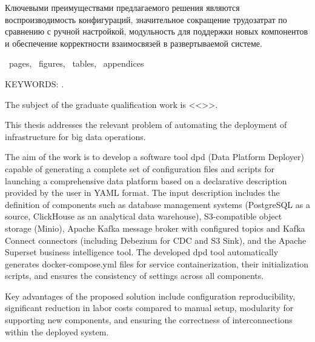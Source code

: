 Ключевыми преимуществами предлагаемого решения являются воспроизводимость конфигураций, значительное сокращение трудозатрат по сравнению с ручной настройкой, модульность для поддержки новых компонентов и обеспечение корректности взаимосвязей в развертываемой системе.




\newpage
\printTheAbstract %


~pages, 
~figures, 
~tables,
~appendices%

{\MakeUppercase{Keywords: \keywordsEn}.} %
	
The subject of the graduate qualification work is <<\thesisTitleEn>>.

This thesis addresses the relevant problem of automating the deployment of infrastructure for big data operations. 

The aim of the work is to develop a software tool dpd (Data Platform Deployer) capable of generating a complete set of configuration files and scripts for launching a comprehensive data platform based on a declarative description provided by the user in YAML format. The input description includes the definition of components such as database management systems (PostgreSQL as a source, ClickHouse as an analytical data warehouse), S3-compatible object storage (Minio), Apache Kafka message broker with configured topics and Kafka Connect connectors (including Debezium for CDC and S3 Sink), and the Apache Superset business intelligence tool. The developed dpd tool automatically generates docker-compose.yml files for service containerization, their initialization scripts, and ensures the consistency of settings across all components. 

Key advantages of the proposed solution include configuration reproducibility, significant reduction in labor costs compared to manual setup, modularity for supporting new components, and ensuring the correctness of interconnections within the deployed system.
	

	


\thispagestyle{empty}
%
